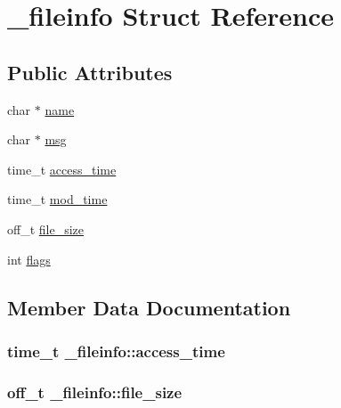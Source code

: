 \hypertarget{struct__fileinfo}{}\section{\+\_\+fileinfo Struct Reference}
\label{struct__fileinfo}
\subsection*{Public Attributes}
\begin{DoxyCompactItemize}
\item 
char $\ast$ \hyperlink{struct__fileinfo_a203585c0c73ab6553ffaf6e0c8b8ee1c}{name}
\item 
char $\ast$ \hyperlink{struct__fileinfo_a12b0aa6954d5dacf2ee0e3209f7873af}{msg}
\item 
time\+\_\+t \hyperlink{struct__fileinfo_af8ba936363aafb7842dd4e113ff2f123}{access\+\_\+time}
\item 
time\+\_\+t \hyperlink{struct__fileinfo_a17b9194f9b657cc80abac1aa26a42661}{mod\+\_\+time}
\item 
off\+\_\+t \hyperlink{struct__fileinfo_a476a96e113e2be0ce30d2ba189b4e532}{file\+\_\+size}
\item 
int \hyperlink{struct__fileinfo_ace325912d8b1e2db21732d0bdeae6e95}{flags}
\end{DoxyCompactItemize}


\subsection{Member Data Documentation}
\subsubsection[{\texorpdfstring{access\+\_\+time}{access_time}}]{\setlength{\rightskip}{0pt plus 5cm}time\+\_\+t \+\_\+fileinfo\+::access\+\_\+time}\hypertarget{struct__fileinfo_af8ba936363aafb7842dd4e113ff2f123}{}\label{struct__fileinfo_af8ba936363aafb7842dd4e113ff2f123}
\subsubsection[{\texorpdfstring{file\+\_\+size}{file_size}}]{\setlength{\rightskip}{0pt plus 5cm}off\+\_\+t \+\_\+fileinfo\+::file\+\_\+size}\hypertarget{struct__fileinfo_a476a96e113e2be0ce30d2ba189b4e532}{}\label{struct__fileinfo_a476a96e113e2be0ce30d2ba189b4e532}
